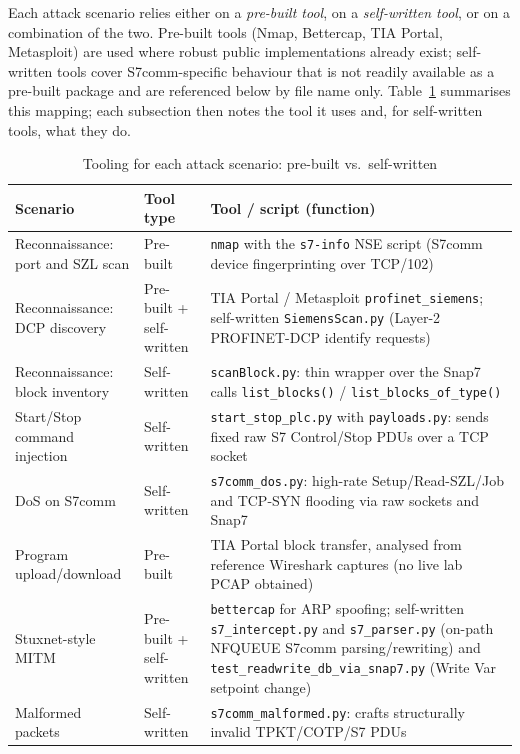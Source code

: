 ﻿\documentclass[../main.tex]{subfiles}
\begin{document}
Each attack scenario relies either on a \emph{pre-built tool}, on a \emph{self-written tool}, or on a combination of the two. Pre-built tools (Nmap, Bettercap, TIA Portal, Metasploit) are used where robust public implementations already exist; self-written tools cover S7comm-specific behaviour that is not readily available as a pre-built package and are referenced below by file name only. Table~\ref{tab:attack-tooling} summarises this mapping; each subsection then notes the tool it uses and, for self-written tools, what they do.

\begin{table}[H]
    \centering
    \caption{Tooling for each attack scenario: pre-built vs.\ self-written}
    \label{tab:attack-tooling}
    \footnotesize
    \begin{tabular}{|p{2.9cm}|p{2.3cm}|p{7.3cm}|}
        \hline
        \textbf{Scenario} & \textbf{Tool type} & \textbf{Tool / script (function)} \\
        \hline
        Reconnaissance: port and SZL scan & Pre-built & \texttt{nmap} with the \texttt{s7-info} NSE script (S7comm device fingerprinting over TCP/102) \\
        \hline
        Reconnaissance: DCP discovery & Pre-built + self-written & TIA Portal / Metasploit \texttt{profinet\_siemens}; self-written \texttt{SiemensScan.py} (Layer-2 PROFINET-DCP identify requests) \\
        \hline
        Reconnaissance: block inventory & Self-written & \texttt{scanBlock.py}: thin wrapper over the Snap7 calls \texttt{list\_blocks()} / \texttt{list\_blocks\_of\_type()} \\
        \hline
        Start/Stop command injection & Self-written & \texttt{start\_stop\_plc.py} with \texttt{payloads.py}: sends fixed raw S7 Control/Stop PDUs over a TCP socket \\
        \hline
        DoS on S7comm & Self-written & \texttt{s7comm\_dos.py}: high-rate Setup/Read-SZL/Job and TCP-SYN flooding via raw sockets and Snap7 \\
        \hline
        Program upload/download & Pre-built & TIA Portal block transfer, analysed from reference Wireshark captures (no live lab PCAP obtained) \\
        \hline
        Stuxnet-style MITM & Pre-built + self-written & \texttt{bettercap} for ARP spoofing; self-written \texttt{s7\_intercept.py} and \texttt{s7\_parser.py} (on-path NFQUEUE S7comm parsing/rewriting) and \texttt{test\_readwrite\_db\_via\_snap7.py} (Write Var setpoint change) \\
        \hline
        Malformed packets & Self-written & \texttt{s7comm\_malformed.py}: crafts structurally invalid TPKT/COTP/S7 PDUs \\
        \hline
    \end{tabular}
\end{table}
\end{document}

